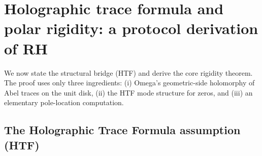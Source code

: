 
\section{Holographic trace formula and polar rigidity: a protocol derivation of RH}
\label{sec:htf_rigidity}

We now state the structural bridge (HTF) and derive the core rigidity theorem.
The proof uses only three ingredients: (i) Omega's geometric-side holomorphy of Abel traces on the unit disk, (ii) the HTF mode structure for zeros, and (iii) an elementary pole-location computation.

\subsection{The Holographic Trace Formula assumption (HTF)}
\label{sec:htf_assumption}

